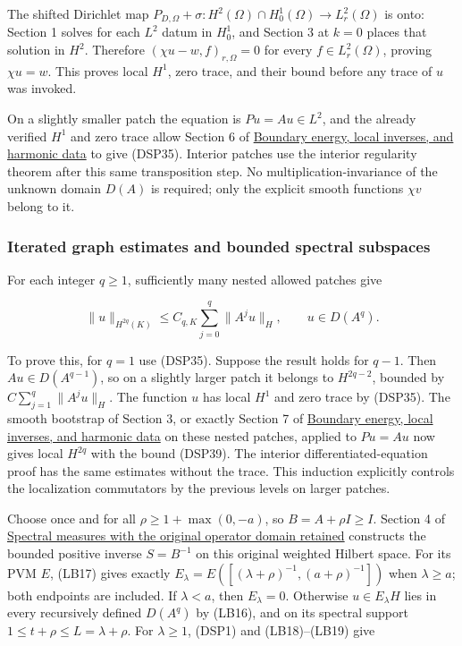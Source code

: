 \documentclass[
  11pt,
]{article}
\makeatletter
\let\ReaderOriginalAnchorStart\hyper@anchorstart
\let\ReaderOriginalAnchorEnd\hyper@anchorend
\let\ReaderPendingAliases\@empty
\def\ReaderArmAliases#1{\gdef\ReaderPendingAliases{#1}}
\def\hyper@anchorstart#1{\ReaderIfNativeAnchorTF{#1}{\ReaderPendingAliases\global\let\ReaderPendingAliases\@empty}{}\ReaderOriginalAnchorStart{#1}}
\makeatother
\begin{document}
The shifted Dirichlet map
\(P_{D,\Omega}+\sigma:H^2(\Omega)\cap H_0^1(\Omega)\to L^2_r(\Omega)\)
is onto: Section 1 solves for each \(L^2\) datum in \(H_0^1\), and
Section 3 at \(k=0\) places that solution in \(H^2\). Therefore
\((\chi u-w,f)_{r,\Omega}=0\) for every \(f\in L^2_r(\Omega)\), proving
\(\chi u=w\). This proves local \(H^1\), zero trace, and their bound
before any trace of \(u\) was invoked.

On a slightly smaller patch the equation is \(Pu=Au\in L^2\), and the
already verified \(H^1\) and zero trace allow Section 6 of
\href{second-order-boundary.pdf}{Boundary energy, local inverses, and
harmonic data} to give (DSP35). Interior patches use the interior
regularity theorem after this same transposition step. No
multiplication-invariance of the unknown domain \(D(A)\) is required;
only the explicit smooth functions \(\chi v\) belong to it.

\ReaderArmAliases{\ReaderOriginalAnchorStart{iterated-graph-estimates-and-bounded-spectral-subspaces}\ReaderOriginalAnchorEnd}
\subsubsection{Iterated graph estimates and bounded spectral
subspaces}\label{iterated-graph-estimates-and-bounded-spectral-subspaces}

For each integer \(q\geq1\), sufficiently many nested allowed patches
give

\[
 \|u\|_{H^{2q}(K)}\leq C_{q,K}\sum_{j=0}^q\|A^ju\|_H,
 \qquad u\in D(A^q).
 \tag{DSP39}
\]

To prove this, for \(q=1\) use (DSP35). Suppose the result holds for
\(q-1\). Then \(Au\in D(A^{q-1})\), so on a slightly larger patch it
belongs to \(H^{2q-2}\), bounded by \(C\sum_{j=1}^q\|A^ju\|_H\). The
function \(u\) has local \(H^1\) and zero trace by (DSP35). The smooth
bootstrap of Section 3, or exactly Section 7 of
\href{second-order-boundary.pdf}{Boundary energy, local inverses, and
harmonic data} on these nested patches, applied to \(Pu=Au\) now gives
local \(H^{2q}\) with the bound (DSP39). The interior
differentiated-equation proof has the same estimates without the trace.
This induction explicitly controls the localization commutators by the
previous levels on larger patches.

Choose once and for all \(\rho\geq1+\max(0,-a)\), so
\(B=A+\rho I\geq I\). Section 4 of
\href{lower-bounded-spectral-calculus.pdf}{Spectral measures with the
original operator domain retained} constructs the bounded positive
inverse \(S=B^{-1}\) on this original weighted Hilbert space. For its
PVM \(E\), (LB17) gives exactly
\(E_\lambda=E([(\lambda+\rho)^{-1},(a+\rho)^{-1}])\) when
\(\lambda\geq a\); both endpoints are included. If \(\lambda<a\), then
\(E_\lambda=0\). Otherwise \(u\in E_\lambda H\) lies in every
recursively defined \(D(A^q)\) by (LB16), and on its spectral support
\(1\leq t+\rho\leq L=\lambda+\rho\). For \(\lambda\geq1\), (DSP1) and
(LB18)--(LB19) give
\end{document}
